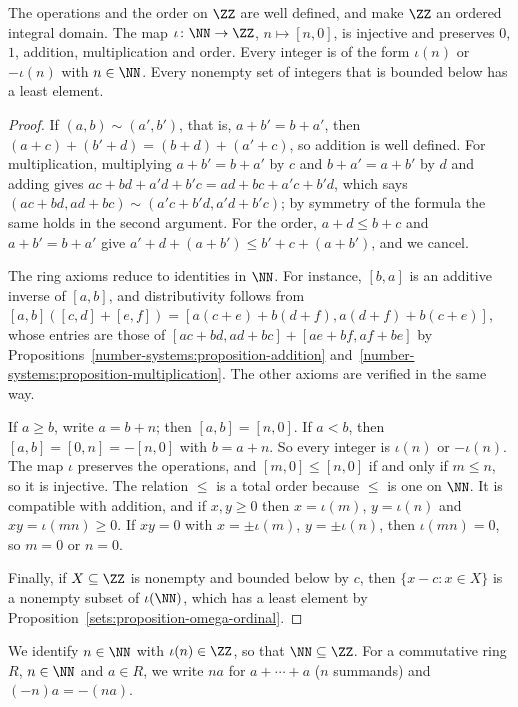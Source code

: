 \begin{theorem}\label{number-systems:theorem-integers}
The operations and the order on $\ZZ$ are well defined, and make $\ZZ$ an
ordered integral domain. The map $\iota \colon \NN \to \ZZ$, $n \mapsto [n, 0]$, is
injective and preserves $0$, $1$, addition, multiplication and order. Every
integer is of the form $\iota(n)$ or $-\iota(n)$ with $n \in \NN$. Every nonempty
set of integers that is bounded below has a least element.
\end{theorem}

\begin{proof}
If $(a, b) \sim (a', b')$, that is, $a + b' = b + a'$, then
$(a + c) + (b' + d) = (b + d) + (a' + c)$, so addition is well defined. For
multiplication, multiplying $a + b' = b + a'$ by $c$ and $b + a' = a + b'$ by $d$
and adding gives $ac + bd + a'd + b'c = ad + bc + a'c + b'd$, which says
$(ac + bd, ad + bc) \sim (a'c + b'd, a'd + b'c)$; by symmetry of the formula the
same holds in the second argument. For the order, $a + d \leq b + c$ and
$a + b' = b + a'$ give $a' + d + (a + b') \leq b' + c + (a + b')$, and we cancel.

The ring axioms reduce to identities in $\NN$. For instance, $[b, a]$ is an
additive inverse of $[a, b]$, and distributivity follows from
$[a, b]([c, d] + [e, f]) = [a(c + e) + b(d + f), a(d + f) + b(c + e)]$, whose
entries are those of $[ac + bd, ad + bc] + [ae + bf, af + be]$ by
Propositions~\ref{number-systems:proposition-addition}
and~\ref{number-systems:proposition-multiplication}. The other axioms are
verified in the same way.

If $a \geq b$, write $a = b + n$; then $[a, b] = [n, 0]$. If $a < b$, then
$[a, b] = [0, n] = -[n, 0]$ with $b = a + n$. So every integer is $\iota(n)$ or
$-\iota(n)$. The map $\iota$ preserves the operations, and $[m, 0] \leq [n, 0]$ if
and only if $m \leq n$, so it is injective. The relation $\leq$ is a total order
because $\leq$ is one on $\NN$. It is compatible with addition, and if
$x, y \geq 0$ then $x = \iota(m)$, $y = \iota(n)$ and $xy = \iota(mn) \geq 0$. If
$xy = 0$ with $x = \pm\iota(m)$, $y = \pm\iota(n)$, then $\iota(mn) = 0$, so
$m = 0$ or $n = 0$.

Finally, if $X \subseteq \ZZ$ is nonempty and bounded below by $c$, then
$\{x - c : x \in X\}$ is a nonempty subset of $\iota(\NN)$, which has a least
element by Proposition~\ref{sets:proposition-omega-ordinal}.
\end{proof}

\begin{notation}\label{number-systems:notation-integers}
We identify $n \in \NN$ with $\iota(n) \in \ZZ$, so that $\NN \subseteq \ZZ$. For a
commutative ring $R$, $n \in \NN$ and $a \in R$, we write $na$ for
$a + \cdots + a$ ($n$ summands) and $(-n)a = -(na)$.
\end{notation}

